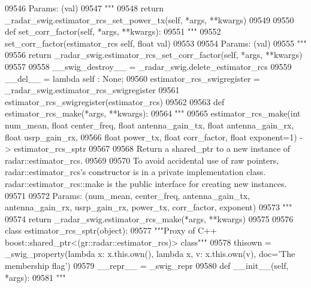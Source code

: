 \begin{DoxyCode}
{{{{{{{{{{{{{{{{{{{{{{{{{{{{{{{09546 \textcolor{stringliteral}{        Params: (val)}
09547 \textcolor{stringliteral}{        """}
09548         \textcolor{keywordflow}{return} \_radar\_swig.estimator\_rcs\_set\_power\_tx(self, *args, **kwargs)
09549 
09550     \textcolor{keyword}{def }set_corr_factor(self, *args, **kwargs):
09551         \textcolor{stringliteral}{"""}
09552 \textcolor{stringliteral}{        set\_corr\_factor(estimator\_rcs self, float val)}
09553 \textcolor{stringliteral}{}
09554 \textcolor{stringliteral}{        Params: (val)}
09555 \textcolor{stringliteral}{        """}
09556         \textcolor{keywordflow}{return} \_radar\_swig.estimator\_rcs\_set\_corr\_factor(self, *args, **kwargs)
09557 
09558     \_\_swig\_destroy\_\_ = \_radar\_swig.delete\_estimator\_rcs
09559     \_\_del\_\_ = \textcolor{keyword}{lambda} self : \textcolor{keywordtype}{None};
09560 estimator\_rcs\_swigregister = \_radar\_swig.estimator\_rcs\_swigregister
09561 estimator_rcs_swigregister(estimator\_rcs)
09562 
09563 \textcolor{keyword}{def }estimator_rcs_make(*args, **kwargs):
09564   \textcolor{stringliteral}{"""}
09565 \textcolor{stringliteral}{    estimator\_rcs\_make(int num\_mean, float center\_freq, float antenna\_gain\_tx, float antenna\_gain\_rx, float
       usrp\_gain\_rx, }
09566 \textcolor{stringliteral}{        float power\_tx, float corr\_factor, float exponent=1) -> estimator\_rcs\_sptr}
09567 \textcolor{stringliteral}{}
09568 \textcolor{stringliteral}{    Return a shared\_ptr to a new instance of radar::estimator\_rcs.}
09569 \textcolor{stringliteral}{}
09570 \textcolor{stringliteral}{    To avoid accidental use of raw pointers, radar::estimator\_rcs's constructor is in a private
       implementation class. radar::estimator\_rcs::make is the public interface for creating new instances.}
09571 \textcolor{stringliteral}{}
09572 \textcolor{stringliteral}{    Params: (num\_mean, center\_freq, antenna\_gain\_tx, antenna\_gain\_rx, usrp\_gain\_rx, power\_tx, corr\_factor,
       exponent)}
09573 \textcolor{stringliteral}{    """}
09574   \textcolor{keywordflow}{return} \_radar\_swig.estimator\_rcs\_make(*args, **kwargs)
09575 
09576 \textcolor{keyword}{class }estimator_rcs_sptr(object):
09577     \textcolor{stringliteral}{"""Proxy of C++ boost::shared\_ptr<(gr::radar::estimator\_rcs)> class"""}
09578     thisown = _swig_property(\textcolor{keyword}{lambda} x: x.this.own(), \textcolor{keyword}{lambda} x, v: x.this.own(v), doc=\textcolor{stringliteral}{'The membership flag'})
09579     \_\_repr\_\_ = \_swig\_repr
09580     \textcolor{keyword}{def }__init__(self, *args): 
09581         \textcolor{stringliteral}{"""}
}}}}}}}}}}}}}}}}}}}}}}}}}}}}}}}
\end{DoxyCode}
